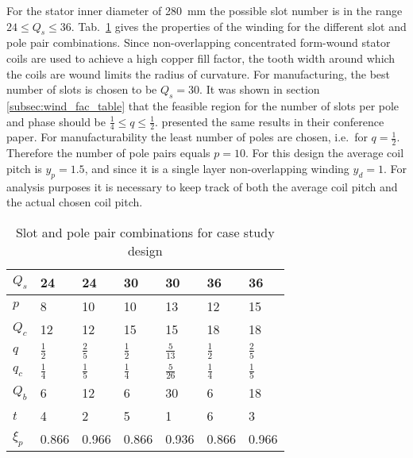 For the stator inner diameter of \SI{280}{mm} the possible slot number is in the range  $24 \leq Q_s \leq 36$. Tab.~\ref{tab:wnd_char} gives the properties of the winding for the different slot and pole pair combinations. Since non-overlapping concentrated form-wound stator coils are used to achieve a high copper fill factor, the tooth width around which the coils are wound limits the radius of curvature. For manufacturing, the best number of slots is chosen to be $Q_{s}=30$. It was shown in section \ref{subsec:wind_fac_table} that the feasible region for the number of slots per pole and phase should be $\frac{1}{4} \leq q \leq \frac{1}{2}$. \cite{skaar_2006} presented the same results in their conference paper. For manufacturability the least number of poles are chosen, i.e.~for $q=\frac{1}{2}$. Therefore the number of pole pairs equals  $p=10$. For this design the average coil pitch is $y_p = 1.5$, and since it is a single layer non-overlapping winding $y_d=1$. For analysis purposes it is necessary to keep track of both the average coil pitch and the actual chosen coil pitch.
\begin{table}[htbp]
  \centering
  \caption{Slot and pole pair combinations for case study design}
	\begin{tabular}{p{1.2cm}p{1.2cm}p{1.2cm}p{1.2cm}p{1.2cm}p{1.2cm}p{1.2cm}}
	\toprule
	$Q_s  $    &   24  &  24  & 30 & 30 & 36 & 36 \\\midrule
	$p    $    &   8   &  10  & 10 & 13 & 12 & 15 \\\midrule
	$Q_c  $    &   12  &  12  & 15 & 15 & 18 & 18 \\\midrule
	$q    $    &$\frac{1}{2}$&
	            $\frac{2}{5}$&
	            $\frac{1}{2}$&
	            $\frac{5}{13}$&
	            $\frac{1}{2}$&
	            $\frac{2}{5}$\\\midrule
	$q_{c}$    &$\frac{1}{4}$&
	            $\frac{1}{5}$&
	            $\frac{1}{4}$&
	            $\frac{5}{26}$&
	            $\frac{1}{4}$&
	            $\frac{1}{5}$\\\midrule
	$Q_b$      &  6   &  12  &  6  & 30 & 6 & 18 \\\midrule
	$t$        &  4   &  2   &  5  & 1  & 6 & 3  \\\midrule
	$\xi_p$    & 0.866 & 0.966 & 0.866 & 0.936 & 0.866 & 0.966 \\\bottomrule
	\end{tabular}
	\label{tab:wnd_char}
\end{table}

